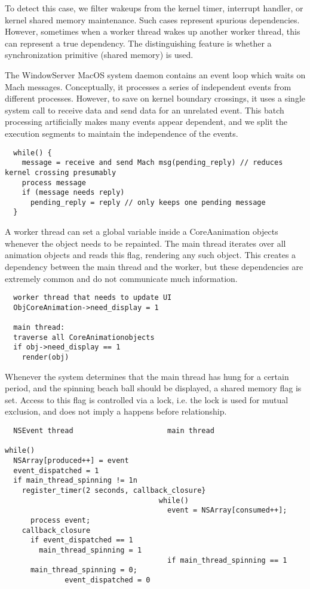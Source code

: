 To detect this case, we filter wakeups from the kernel timer, interrupt
handler, or kernel shared memory maintenance. Such cases represent spurious
dependencies. However, sometimes when a worker thread wakes up another worker
thread, this can represent a true dependency. The distinguishing feature is
whether a synchronization primitive (shared memory) is used.

The WindowServer MacOS system daemon contains an event loop which waits on Mach
messages. Conceptually, it processes a series of independent events from
different processes. However, to save on kernel boundary crossings, it uses a
single system call to receive data and send data for an unrelated event. This
batch processing artificially makes many events appear dependent, and we split
the execution segments to maintain the independence of the events.

{\footnotesize \begin{verbatim}
  while() {
    message = receive and send Mach msg(pending_reply) // reduces
kernel crossing presumably
    process message
    if (message needs reply)
      pending_reply = reply // only keeps one pending message
  }
\end{verbatim}
}

A worker thread can set a global variable inside a CoreAanimation objects
whenever the object needs to be repainted. The main thread iterates over all
animation objects and reads this flag, rendering any such object. This creates
a dependency between the main thread and the worker, but these dependencies are
extremely common and do not communicate much information.

{\footnotesize \begin{verbatim}
  worker thread that needs to update UI
  ObjCoreAnimation->need_display = 1

  main thread:
  traverse all CoreAnimationobjects
  if obj->need_display == 1
    render(obj)
\end{verbatim}
}

Whenever the system determines that the main thread has hung for a certain
period, and the spinning beach ball should be displayed, a shared memory flag
is set. Access to this flag is controlled via a lock, i.e. the lock is used for
mutual exclusion, and does not imply a happens before relationship.

{\footnotesize \begin{verbatim}
  NSEvent thread                      main thread

while()
  NSArray[produced++] = event
  event_dispatched = 1
  if main_thread_spinning != 1n
    register_timer(2 seconds, callback_closure}
                                    while()
                                      event = NSArray[consumed++];
      process event;
    callback_closure
      if event_dispatched == 1
        main_thread_spinning = 1
                                      if main_thread_spinning == 1
      main_thread_spinning = 0;
              event_dispatched = 0
\end{verbatim}
}

